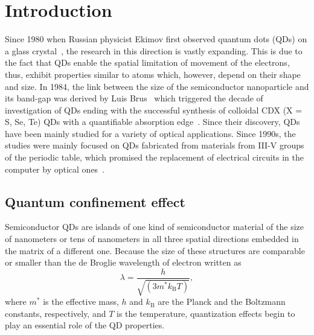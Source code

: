 \documentclass[
a4paper, %
11pt, %
onecolumn, %
openany, %
oldfontcommands,
]{memoir}
\begin{document}
\newpage
\cleardoublepage


\pagestyle{standard}

\tableofcontents*


\clearpage



\chapter{Introduction}\label{chap:introduction}


Since 1980 when Russian physicist Ekimov first observed quantum dots (QDs) on a glass crystal~\cite{Ekimov}, the research in this direction is vastly expanding. This is due to the fact that QDs enable the spatial limitation of movement of the electrons, thus, exhibit properties similar to atoms which, however, depend on their shape and size. In 1984, the link between the size of the semiconductor nanoparticle and its band-gap was derived by Luis Brus~\cite{Brus} which triggered the decade of investigation of QDs ending with the successful synthesis of colloidal CDX (X = S, Se, Te) QDs with a quantifiable absorption edge~\cite{Murray}. Since their discovery, QDs have been mainly studied for a variety of optical applications. Since 1990s, the studies were mainly focused on QDs fabricated from materials from III-V groups of the periodic table, which promised the replacement of electrical circuits in the computer by optical ones~\cite{Bimberg}. %

\section{Quantum confinement effect}
Semiconductor QDs are islands of one kind of semiconductor material of the size of nanometers or tens of nanometers in all three spatial directions embedded in the matrix of a different one. Because the size of these structures are comparable or smaller than the de Broglie wavelength of electron written as
\begin{equation}
\lambda=\frac{h}{\sqrt{(3m^*k_\mathrm{B}T)}},
\end{equation}
where $m^*$ is the effective mass, $h$ and $k_\mathrm{B}$ are the Planck and the Boltzmann constants, respectively, and $T$ is the temperature, quantization effects begin to play an essential role of the QD properties.
\end{document}
